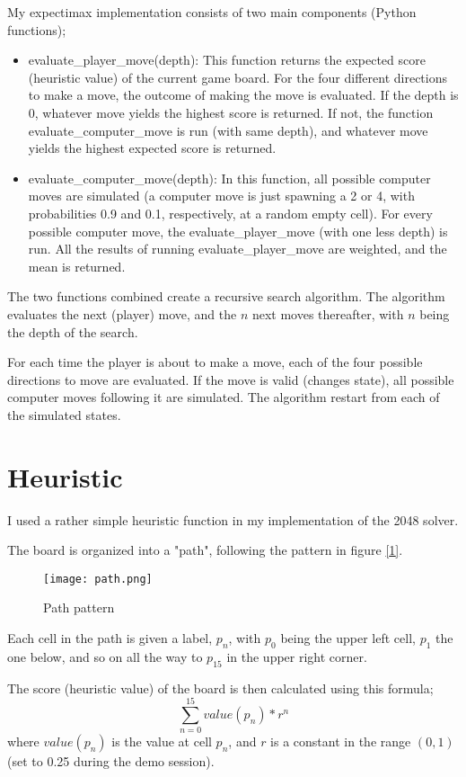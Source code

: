 \documentclass{article}
\begin{document}
My expectimax implementation consists of two main components (Python functions);
\begin{itemize}
    \item evaluate\_player\_move(depth): This function returns the expected score (heuristic value) of the current game board. For the four different directions to make a move, the outcome of making the move is evaluated. If the depth is 0, whatever move yields the highest score is returned. If not, the function evaluate\_computer\_move is run (with same depth), and whatever move yields the highest expected score is returned.
    \item evaluate\_computer\_move(depth): In this function, all possible computer moves are simulated (a computer move is just spawning a 2 or 4, with probabilities 0.9 and 0.1, respectively, at a random empty cell). For every possible computer move, the evaluate\_player\_move (with one less depth) is run. All the results of running evaluate\_player\_move are weighted, and the mean is returned.
\end{itemize}

The two functions combined create a recursive search algorithm. The algorithm evaluates the next (player) move, and the $n$ next moves thereafter, with $n$ being the depth of the search.

For each time the player is about to make a move, each of the four possible directions to move are evaluated. If the move is valid (changes state), all possible computer moves following it are simulated. The algorithm restart from each of the simulated states.

\section{Heuristic}
I used a rather simple heuristic function in my implementation of the 2048 solver.

The board is organized into a "path", following the pattern in figure \hyperref[fig:path]{[\ref*{fig:path}]}.
\begin{figure}[H]
	\centering	
	\texttt{[image: path.png]}
	\caption{Path pattern}
	\label{fig:path}
\end{figure}
Each cell in the path is given a label, $p_n$, with $p_0$ being the upper left cell, $p_1$ the one below, and so on all the way to $p_{15}$ in the upper right corner.

The score (heuristic value) of the board is then calculated using this formula;
\begin{equation}
	\sum\limits_{n=0}^{15}value(p_n)*r^n
\end{equation}
where $value(p_n)$ is the value at cell $p_n$, and $r$ is a constant in the range $(0, 1)$ (set to 0.25 during the demo session).
\end{document}
